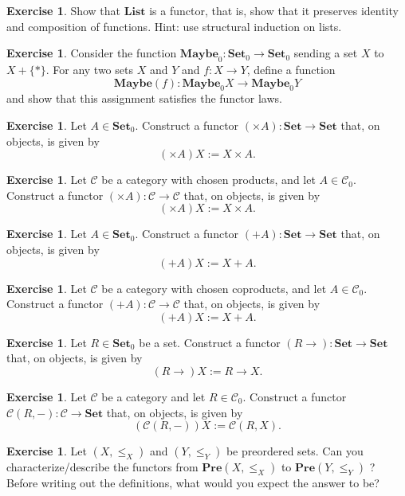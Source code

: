 \documentclass[a4paper,10pt]{scrartcl}
\theoremstyle{plain}
\theoremstyle{definition}
\newtheorem{exer}[thm]{Exercise}
\newcommand{\Cat}[1]{\mathcal{#1}}
\newcommand{\CC}{\Cat{C}}
\newcommand{\Catb}[1]{\mathbf{#1}}
\newcommand{\List}{\Catb{List}}
\newcommand{\Maybe}{\Catb{Maybe}}
\newcommand{\SET}{\Catb{Set}}
\newcommand{\PRE}{\Catb{Pre}}
\newcommand{\Ob}[1]{{#1}_0}
\newcommand{\CHom}[3]{{#1}(#2,#3)}
\begin{document}
\begin{exer}
  Show that $\List$ is a  functor, that is, show that it preserves identity and composition of functions.
  Hint: use structural induction on lists.
\end{exer}

\begin{exer}
  Consider the function $\Ob{\Maybe} : \Ob\SET \to \Ob\SET$ sending a set $X$ to $X + \{*\}$.
  For any two sets $X$ and $Y$ and $f : X \to Y$, define a function
  \[ \Maybe(f) : \Ob\Maybe X \to \Ob\Maybe Y\]
  and show that this assignment satisfies the functor laws.
\end{exer}

\begin{exer}
  Let $A \in \Ob\SET$.
  Construct a functor $(\times A) : \SET \to \SET$ that, on objects, is given by
  \[ (\times A) X := X \times A. \]
\end{exer}


\begin{exer}
  Let $\CC$ be a category with chosen products, and let $A \in \Ob\CC$.
  Construct a functor $(\times A) : \CC \to \CC$ that, on objects, is given by
  \[ (\times A) X := X \times A. \]
\end{exer}

\begin{exer}
  Let $A \in \Ob\SET$.
  Construct a functor $(+ A) : \SET \to \SET$ that, on objects, is given by
  \[ (+ A) X := X + A. \]
\end{exer}

\begin{exer}
  Let $\CC$ be a category with chosen coproducts, and let $A \in \Ob\CC$.
  Construct a functor $(+ A) : \CC \to \CC$ that, on objects, is given by
  \[ (+ A) X := X + A. \]
\end{exer}

\begin{exer}
  Let $R \in \Ob\SET$ be a set.
  Construct a functor $(R \to) : \SET \to \SET$ that, on objects, is given by
  \[ (R \to) X := R \to X. \]
\end{exer}

\begin{exer}
  Let $\CC$ be a category and let $R \in \Ob\CC$.
  Construct a functor $\CHom \CC R - : \CC \to \SET$ that, on objects, is given by
  \[ (\CHom \CC R -) X := \CHom \CC R X. \]
\end{exer}


\begin{exer}\label{ex:poset_functors} Let $(X,\leq_X)$ and $(Y,\leq_Y)$ be preordered sets. Can you characterize/describe the functors from $\PRE(X,\leq_X)$ to $\PRE(Y,\leq_Y)$  ? Before writing out the definitions, what would you expect the answer to be?
\end{exer}
\end{document}

